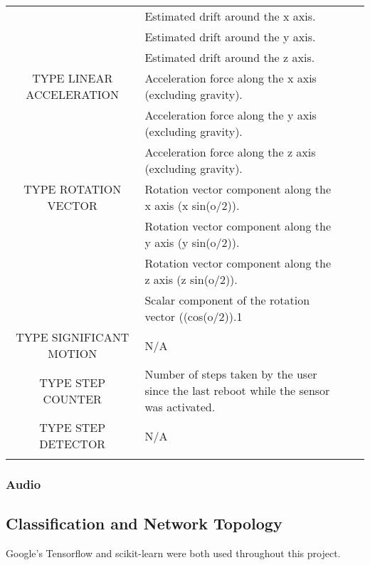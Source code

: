 \documentclass{UoNMCHA}
\numberwithin{equation}{section}
\begin{document}
\begin{table}[h!]
\begin{center}
{\begin{tabular}{c l l l|}
                  & Estimated drift around the x axis. \\
                  & Estimated drift around the y axis. \\
                  & Estimated drift around the z axis. \\
                TYPE LINEAR ACCELERATION & Acceleration force along the x axis (excluding gravity). \\
                  & Acceleration force along the y axis (excluding gravity). \\
                  & Acceleration force along the z axis (excluding gravity). \\
                TYPE ROTATION VECTOR & Rotation vector component along the x axis (x  sin(o/2)). \\
                  & Rotation vector component along the y axis (y  sin(o/2)). \\
                  & Rotation vector component along the z axis (z  sin(o/2)). \\
                  & Scalar component of the rotation vector ((cos(o/2)).1 \\
                TYPE SIGNIFICANT MOTION & N/A \\
                TYPE STEP COUNTER & Number of steps taken by the user since the last reboot while the sensor was activated. \\
                TYPE STEP DETECTOR & N/A \\
                \\ \hline
            \end{tabular}
        }
    \end{center}
\end{table}

\subsubsection{Audio}

\subsection{Classification and Network Topology}
Google's Tensorflow and scikit-learn were both used throughout this project. 
\end{document}
